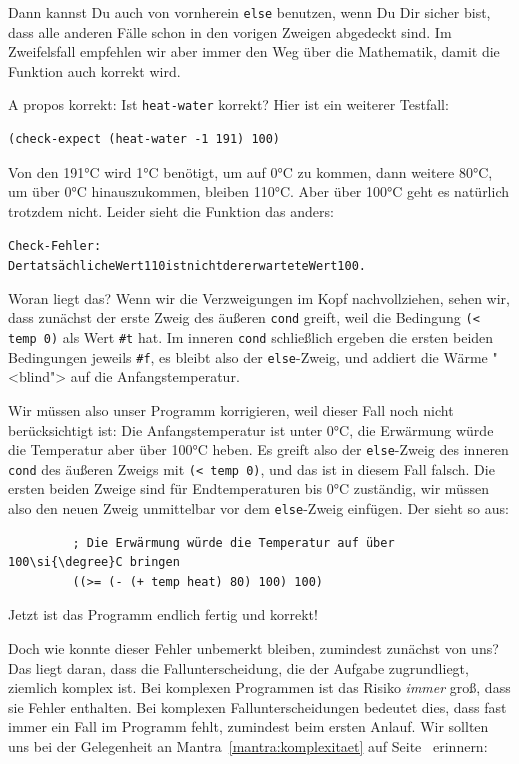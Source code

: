 Dann kannst Du auch von vornherein \lstinline{else} benutzen, wenn Du Dir
sicher bist, dass alle anderen Fälle schon in den vorigen Zweigen
abgedeckt sind.  Im Zweifelsfall empfehlen wir aber immer den Weg über
die Mathematik, damit die Funktion auch korrekt wird.

A propos korrekt: Ist \lstinline{heat-water} korrekt?  Hier ist ein
weiterer Testfall:
%
\begin{lstlisting}
(check-expect (heat-water -1 191) 100)
\end{lstlisting}
%
Von den 191\si{\degree}C wird 1\si{\degree}C benötigt, um auf 0\si{\degree}C zu kommen, dann weitere
80\si{\degree}C, um über 0\si{\degree}C hinauszukommen, bleiben 110\si{\degree}C.  Aber über 100\si{\degree}C geht
es natürlich trotzdem nicht.  Leider sieht die Funktion das anders:
%
\begin{alltt}
Check-Fehler:
	Der tatsächliche Wert 110 ist nicht der erwartete Wert 100.
\end{alltt}
%
Woran liegt das?  Wenn wir die Verzweigungen im Kopf nachvollziehen,
sehen wir, dass zunächst der erste Zweig des äußeren \lstinline{cond}
greift, weil die Bedingung \lstinline{(< temp 0)} als Wert \lstinline{#t} hat.
Im inneren \lstinline{cond} schließlich ergeben die ersten beiden
Bedingungen jeweils \lstinline{#f}, es bleibt also der \lstinline{else}-Zweig,
und addiert die Wärme "<blind"> auf die Anfangstemperatur.

Wir müssen also unser Programm korrigieren, weil dieser Fall noch
nicht berücksichtigt ist: Die Anfangstemperatur ist unter 0\si{\degree}C, die
Erwärmung würde die Temperatur aber über 100\si{\degree}C heben.  Es greift also
der \lstinline{else}-Zweig des inneren \lstinline{cond} des äußeren Zweigs
mit \lstinline{(< temp 0)}, und das ist in diesem Fall falsch.  Die
ersten beiden Zweige sind für Endtemperaturen bis 0\si{\degree}C zuständig, wir
müssen also den neuen Zweig unmittelbar vor dem \lstinline{else}-Zweig
einfügen.  Der sieht so aus:
%
\begin{lstlisting}
         ; Die Erwärmung würde die Temperatur auf über 100\si{\degree}C bringen
         ((>= (- (+ temp heat) 80) 100) 100)
\end{lstlisting}
%
Jetzt ist das Programm endlich fertig und korrekt!

Doch wie konnte dieser Fehler unbemerkt bleiben, zumindest zunächst
von uns?  Das liegt daran, dass die Fallunterscheidung, die der
Aufgabe zugrundliegt, ziemlich komplex ist.  Bei komplexen Programmen
ist das Risiko \emph{immer} groß, dass sie Fehler enthalten.  Bei
komplexen Fallunterscheidungen bedeutet dies, dass fast immer ein Fall
im Programm fehlt, zumindest beim ersten Anlauf.  Wir sollten uns bei
der Gelegenheit an Mantra~\ref{mantra:komplexitaet} auf
Seite~\pageref{mantra:komplexitaet} erinnern:

